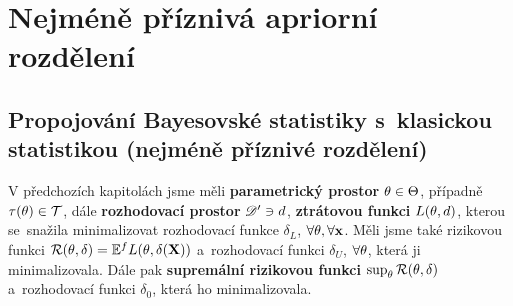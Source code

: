 \chapter{Nejméně příznivá apriorní rozdělení}

\section{Propojování Bayesovské statistiky s~klasickou statistikou (nejméně příznivé rozdělení)}
V předchozích kapitolách jsme měli \textbf{parametrický prostor} $\theta\in\Theta$, případně $\tau(\theta)\in\mathcal{T}$, dále \textbf{rozhodovací prostor} $\mathscr{D}'\ni d $, \textbf{ztrátovou funkci}  $L(\theta,d)$, kterou se~snažila minimalizovat rozhodovací funkce $\delta_L$, $\forall \theta,\forall \textbf{x}$. Měli jsme také rizikovou funkci $\mathcal{R}(\theta,\delta)=\mathbb{E}^fL(\theta,\delta(\textbf{X}))$ a~rozhodovací funkci $\delta_U$, $\forall\theta$, která ji minimalizovala. Dále pak \textbf{supremální rizikovou funkci} $\sup_\theta\mathcal{R}(\theta,\delta)$ a~rozhodovací funkci $\delta_0$, která ho minimalizovala. 

